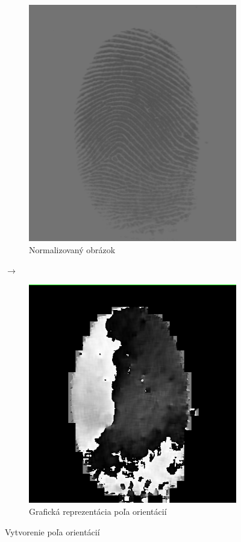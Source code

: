 \documentclass[11pt,a4paper]{article}
\begin{document}
\begin{figure}[h!]
	\centering
	\begin{subfigure}{0.42\textwidth}
		\centering
		\includegraphics[width=\linewidth]{images/Screenshot_8}
		\caption{Normalizovaný obrázok}
	\end{subfigure}%
	{\LARGE$\xrightarrow{}$}
	\begin{subfigure}{0.45\textwidth}
		\centering
		\includegraphics[width=\linewidth]{images/Screenshot_10}
		\caption{Grafická reprezentácia poľa orientácií}
	\end{subfigure}%
	\caption{Vytvorenie poľa orientácií}\label{fig:5}
\end{figure}
\end{document}
